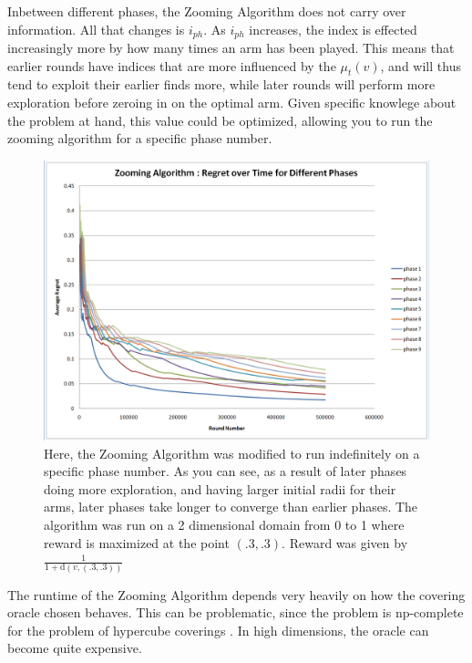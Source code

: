 Inbetween different phases, the Zooming Algorithm does not carry over
information. All that changes is $i_{ph}$. As $i_{ph}$ increases, the
index is effected increasingly more by how many times an arm has been
played. This means that earlier rounds have indices that are more
influenced by the $\mu_t(v)$, and will thus tend to exploit their
earlier finds more, while later rounds will perform more exploration
before zeroing in on the optimal arm. Given specific knowlege about
the problem at hand, this value could be optimized, allowing you to
run the zooming algorithm for a specific phase number.

\begin{figure}[!ht]
  \begin{center}
    \includegraphics[width=5 in]{figures/Phase_Comparison.png}
     \caption{Here, the Zooming Algorithm was modified to run
       indefinitely on a specific phase number. As you can see, as a
       result of later phases doing more exploration, and having
       larger initial radii for their arms, later phases take longer
       to converge than earlier phases. The algorithm was run on a 2
       dimensional domain from 0 to 1 where reward is maximized at the
       point $(.3,.3)$. Reward was given by
       $\frac{1}{1+\mathrm{d}(v,(.3,.3))}$}
     \label{fig:zoomphase}
  \end{center}
\end{figure}



The runtime of the Zooming Algorithm depends very heavily on how the
covering oracle chosen behaves. This can be problematic, since the problem
is np-complete for the problem of hypercube coverings  \cite{Hoffmann05acovering} . In high dimensions,
the oracle can become quite expensive.

